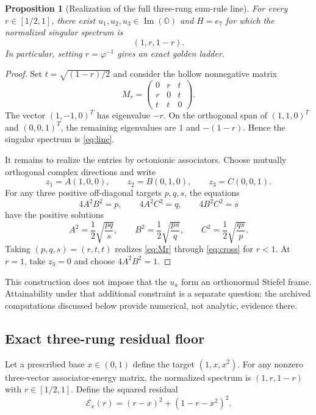 \documentclass[11pt]{article}
\newcommand{\Oa}{\mathbb{O}}
\newtheorem{proposition}[theorem]{Proposition}
\theoremstyle{remark}
\begin{document}
\begin{proposition}[Realization of the full three-rung sum-rule line]
For every $r\in[1/2,1]$, there exist $u_1,u_2,u_3\in\operatorname{Im}(\Oa)$ and $H=e_7$ for which the normalized singular spectrum is
\begin{equation}
 (1,r,1-r).
 \label{eq:line}
\end{equation}
In particular, setting $r=\varphi^{-1}$ gives an exact golden ladder.
\end{proposition}

\begin{proof}
Set $t=\sqrt{(1-r)/2}$ and consider the hollow nonnegative matrix
\begin{equation}
 M_r=
 \begin{pmatrix}
 0&r&t\\
 r&0&t\\
 t&t&0
 \end{pmatrix}.
 \label{eq:Mr}
\end{equation}
The vector $(1,-1,0)^T$ has eigenvalue $-r$.  On the orthogonal span of $(1,1,0)^T$ and $(0,0,1)^T$, the remaining eigenvalues are $1$ and $-(1-r)$.  Hence the singular spectrum is \eqref{eq:line}.

It remains to realize the entries by octonionic associators.  Choose mutually orthogonal complex directions and write
\[
 z_1=A(1,0,0),\qquad z_2=B(0,1,0),\qquad z_3=C(0,0,1).
\]
For any three positive off-diagonal targets $p,q,s$, the equations
\[
 4A^2B^2=p,\qquad4A^2C^2=q,\qquad4B^2C^2=s
\]
have the positive solutions
\[
 A^2=\frac12\sqrt{\frac{pq}{s}},\qquad
 B^2=\frac12\sqrt{\frac{ps}{q}},\qquad
 C^2=\frac12\sqrt{\frac{qs}{p}}.
\]
Taking $(p,q,s)=(r,t,t)$ realizes \eqref{eq:Mr} through
\eqref{eq:cross} for $r<1$.  At $r=1$, take $z_3=0$ and choose
$4A^2B^2=1$.
\end{proof}

This construction does not impose that the $u_a$ form an orthonormal Stiefel frame.  Attainability under that additional constraint is a separate question; the archived computations discussed below provide numerical, not analytic, evidence there.

\subsection{Exact three-rung residual floor}

Let a prescribed base $x\in(0,1)$ define the target $(1,x,x^2)$.  For any nonzero three-vector associator-energy matrix, the normalized spectrum is $(1,r,1-r)$ with $r\in[1/2,1]$.  Define the squared residual
\begin{equation}
 \mathcal E_x(r)=(r-x)^2+(1-r-x^2)^2.
 \label{eq:objective}
\end{equation}
\end{document}
